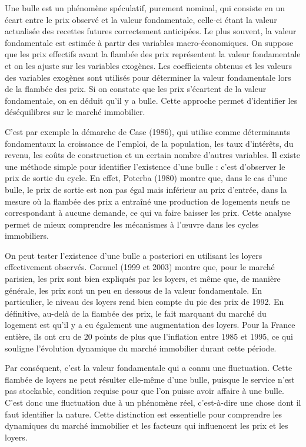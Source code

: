 \documentclass[a4paper, 12pt]{report}
\begin{document}
Une bulle est un phénomène spéculatif, purement nominal, qui consiste en un écart entre le prix observé et la valeur fondamentale, celle-ci étant la valeur actualisée des recettes futures correctement anticipées. Le plus souvent, la valeur fondamentale est estimée à partir des variables macro-économiques. On suppose que les prix effectifs avant la flambée des prix représentent la valeur fondamentale et on les ajuste sur les variables exogènes. Les coefficients obtenus et les valeurs des variables exogènes sont utilisés pour déterminer la valeur fondamentale lors de la flambée des prix. Si on constate que les prix s'écartent de la valeur fondamentale, on en déduit qu'il y a bulle. Cette approche permet d'identifier les déséquilibres sur le marché immobilier.

C’est par exemple la démarche de Case (1986), qui utilise comme déterminants fondamentaux la croissance de l’emploi, de la population, les taux d’intérêts, du revenu, les coûts de construction et un certain nombre d’autres variables. Il existe une méthode simple pour identifier l’existence d’une bulle : c’est d’observer le prix de sortie du cycle. En effet, Poterba (1980) montre que, dans le cas d’une bulle, le prix de sortie est non pas égal mais inférieur au prix d’entrée, dans la mesure où la flambée des prix a entraîné une production de logements neufs ne correspondant à aucune demande, ce qui va faire baisser les prix. Cette analyse permet de mieux comprendre les mécanismes à l'œuvre dans les cycles immobiliers.

On peut tester l’existence d’une bulle a posteriori en utilisant les loyers effectivement observés. Cornuel (1999 et 2003) montre que, pour le marché parisien, les prix sont bien expliqués par les loyers, et même que, de manière générale, les prix sont un peu en dessous de la valeur fondamentale. En particulier, le niveau des loyers rend bien compte du pic des prix de 1992. En définitive, au-delà de la flambée des prix, le fait marquant du marché du logement est qu’il y a eu également une augmentation des loyers. Pour la France entière, ils ont cru de 20 points de plus que l’inflation entre 1985 et 1995, ce qui souligne l’évolution dynamique du marché immobilier durant cette période.

Par conséquent, c’est la valeur fondamentale qui a connu une fluctuation. Cette flambée de loyers ne peut résulter elle-même d’une bulle, puisque le service n’est pas stockable, condition requise pour que l’on puisse avoir affaire à une bulle. C’est donc une fluctuation due à un phénomène réel, c’est-à-dire une chose dont il faut identifier la nature. Cette distinction est essentielle pour comprendre les dynamiques du marché immobilier et les facteurs qui influencent les prix et les loyers.
\end{document}
